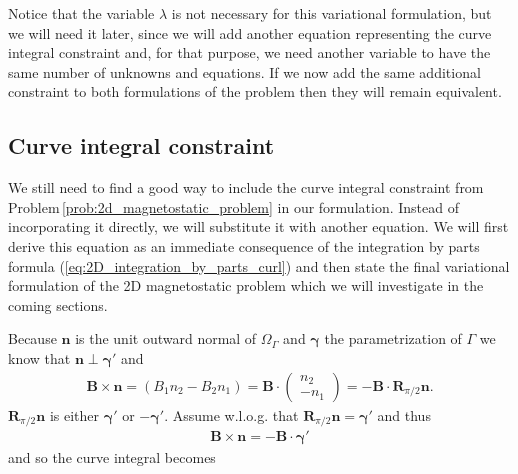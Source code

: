 \documentclass[../master_thesis.tex]{subfiles}
\begin{document}
Notice that the variable $\lambda$ is not necessary for this variational formulation, 
but we will need it later, since we will add another equation representing the 
curve integral constraint and, for that purpose, we need another variable to have the same 
number of unknowns and equations.
If we now add the same additional constraint to both formulations of the problem 
then they will remain equivalent.


\subsection{Curve integral constraint}\label{sec:curve_integral_constraint}

We still need to find a good way to include the curve integral constraint from 
Problem\,\ref{prob:2d_magnetostatic_problem} in our formulation. Instead of incorporating 
it directly, we will substitute it with another equation. We will first derive this 
equation as an immediate consequence of the integration by parts formula 
(\ref{eq:2D_integration_by_parts_curl}) and then state the 
final variational formulation of the 2D magnetostatic problem which we 
will investigate in the coming sections.

Because $\mathbf{n}$ is the unit outward normal 
of $\Omega_\Gamma$ and $\bm{\gamma}$ the parametrization of $\Gamma$ we know that $\mathbf{n} \perp \bm{\gamma}'$
and
\begin{align*}
    \mathbf{B}\times \mathbf{n} 
    = (B_1 n_2 - B_2 n_1) = \mathbf{B} \cdot \begin{pmatrix}n_2 \\ -n_1 \end{pmatrix}
    = -\mathbf{B} \cdot \mathbf{R}_{\pi/2}\mathbf{n}.
\end{align*}
$\mathbf{R}_{\pi/2} \mathbf{n}$ is either $\bm{\gamma}'$ or $-\bm{\gamma}'$. Assume w.l.o.g.
that $\mathbf{R}_{\pi/2} \mathbf{n} = \bm{\gamma}'$ and thus 
\begin{align*}
    \mathbf{B} \times \mathbf{n} = -\mathbf{B} \cdot \bm{\gamma}'
\end{align*}
and so the curve integral becomes
\end{document}
